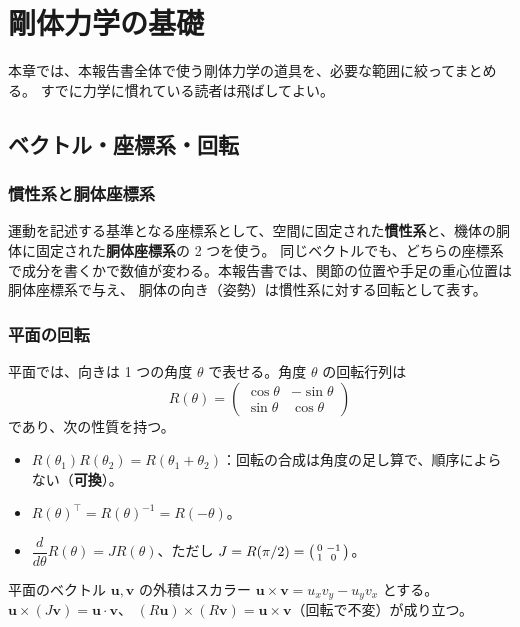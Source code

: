 \chapter{剛体力学の基礎}\label{ch:basics-rigid}

本章では、本報告書全体で使う剛体力学の道具を、必要な範囲に絞ってまとめる。
すでに力学に慣れている読者は飛ばしてよい。

\section{ベクトル・座標系・回転}

\subsection{慣性系と胴体座標系}

運動を記述する基準となる座標系として、空間に固定された\textbf{慣性系}と、機体の胴体に固定された\textbf{胴体座標系}の 2 つを使う。
同じベクトルでも、どちらの座標系で成分を書くかで数値が変わる。本報告書では、関節の位置や手足の重心位置は胴体座標系で与え、
胴体の向き（姿勢）は慣性系に対する回転として表す。

\subsection{平面の回転}

平面では、向きは 1 つの角度 $\theta$ で表せる。角度 $\theta$ の回転行列は
\begin{equation}
R(\theta) = \begin{pmatrix}\cos\theta & -\sin\theta\\ \sin\theta & \cos\theta\end{pmatrix}
\end{equation}
であり、次の性質を持つ。
\begin{itemize}
\item $R(\theta_1)R(\theta_2) = R(\theta_1+\theta_2)$：回転の合成は角度の足し算で、順序によらない（\textbf{可換}）。
\item $R(\theta)^\top = R(\theta)^{-1} = R(-\theta)$。
\item $\dfrac{d}{d\theta}R(\theta) = J R(\theta)$、ただし $J = R(\pi/2) = \begin{psmallmatrix}0&-1\\1&0\end{psmallmatrix}$。
\end{itemize}
平面のベクトル $\bm u,\bm v$ の外積はスカラー $\bm u\times\bm v = u_xv_y - u_yv_x$ とする。$\bm u\times(J\bm v) = \bm u\cdot\bm v$、
$(R\bm u)\times(R\bm v) = \bm u\times\bm v$（回転で不変）が成り立つ。

